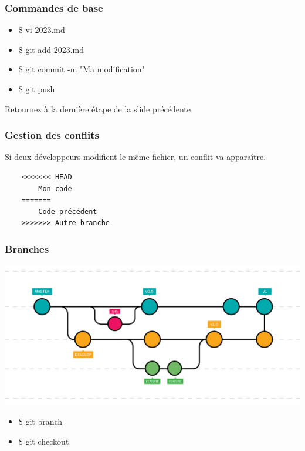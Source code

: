 \documentclass{beamer}
\begin{document}

\begin{frame}\frametitle{Commandes de base}
    \begin{itemize}
        \item \$ vi 2023.md
        \item \$ git add 2023.md
        \item \$ git commit -m "Ma modification"
        \item \$ git push
    \end{itemize}

    Retournez à la dernière étape de la slide précédente
\end{frame}


\begin{frame}[fragile]\frametitle{Gestion des conflits}
    Si deux développeurs modifient le même fichier, un conflit va apparaître.
    \begin{verbatim}
    <<<<<<< HEAD
        Mon code
    =======
        Code précédent
    >>>>>>> Autre branche
    \end{verbatim}
\end{frame}


\begin{frame}\frametitle{Branches}
    \begin{center}
        \includegraphics[scale=0.185]{branch.png}
    \end{center}
    \begin{itemize}
        \item \$ git branch
        \item \$ git checkout
    \end{itemize}
\end{frame}
\end{document}
